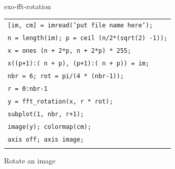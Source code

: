 \begin{correction}{exo-fft-rotation}
\begin{enumerate}
\begin{listing} 
\begin{footnotesize} 
{\upshape
\begin{tabular}{l} \texttt{[im, cm] = imread('put file name here');} \\
\texttt{n = length(im); p = ceil (n/2*(sqrt(2) -1));} \\
\texttt{x = ones (n + 2*p, n + 2*p) * 255;} \\
\texttt{x((p+1):( n + p), (p+1):( n + p)) = im;} \\
\texttt{nbr = 6; rot = pi/(4 * (nbr-1));} \\
\texttt{\pfor r = 0:nbr-1} \\
\quad \texttt{y = fft\_rotation(x, r * rot);} \\
\quad \texttt{subplot(1, nbr, r+1);} \\
\quad \texttt{image(y); colormap(cm);} \\
\quad \texttt{axis off; axis image;} \\
\texttt{\pend} \\
\end{tabular}
}
\end{footnotesize}
\caption{Rotate an image}
\label{listing-applies-rotation}
\end{listing}
\end{enumerate}
\end{correction}
 

